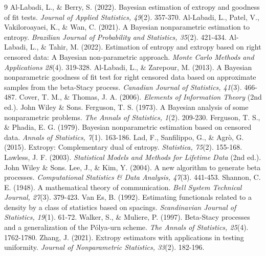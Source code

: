 \documentclass[twoside]{article}
\begin{document}
\begin{thebibliography}{9}
Al-Labadi, L., \& Berry, S. 
(2022). 
Bayesian estimation of extropy and goodness of fit tests. 
\textit{Journal of Applied Statistics, 49}(2).
357-370. 
Al-Labadi, L., Patel, V., Vakiloroayaei, K., \& Wan, C. 
(2021). 
A Bayesian nonparametric estimation to entropy. 
\textit{Brazilian Journal of Probability and Statistics, 35}(2).
421-434. 
Al-Labadi, L., \& Tahir, M. 
(2022). 
Estimation of entropy and extropy based on right censored data: 
A Bayesian non-parametric approach.
\textit{Monte Carlo Methods and Applications 28}(4).
319-328.
Al-Labadi, L., \& Zarepour, M. 
(2013). 
A Bayesian nonparametric goodness of fit test for right censored data based on approximate samples from the beta-Stacy process. 
\textit{Canadian Journal of Statistics, 41}(3).
466-487. 
Cover, T. M., \& Thomas, J. A. 
(2006).
\textit{Elements of Information Theory} (2nd ed.).
John Wiley \& Sons. 
Ferguson, T. S. 
(1973). 
A Bayesian analysis of some nonparametric problems.
\textit{The Annals of Statistics, 1}(2).
209-230.  
Ferguson, T. S., \& Phadia, E. G. 
(1979). 
Bayesian nonparametric estimation based on censored data. 
\textit{Annals of Statistics, 7}(1).
163-186.  
Lad, F., Sanfilippo, G., \& Agrò, G. 
(2015). 
Extropy: Complementary dual of entropy. 
\textit{Statistica, 75}(2).
155-168. 
Lawless, J. F. 
(2003). 
\textit{Statistical Models and Methods for Lifetime Data} (2nd ed.).
John Wiley \& Sons.  
Lee, J., \& Kim, Y. 
(2004). 
A new algorithm to generate beta processes. 
\textit{Computational Statistics \& Data Analysis, 47}(3).
441-453.
Shannon, C. E. 
(1948). 
A mathematical theory of communication. 
\textit{Bell System Technical Journal, 27}(3).
379-423. 
Van Es, B. 
(1992). 
Estimating functionals related to a density by a class of statistics based on spacings. 
\textit{Scandinavian Journal of Statistics, 19}(1).
61-72.
Walker, S., \& Muliere, P. 
(1997). 
Beta-Stacy processes and a generalization of the Pólya-urn scheme. 
\textit{The Annals of Statistics, 25}(4).
1762-1780.
Zhang, J. 
(2021). 
Extropy estimators with applications in testing uniformity. 
\textit{Journal of Nonparametric Statistics, 33}(2).
182-196.  
\end{thebibliography}
 
\end{document}
